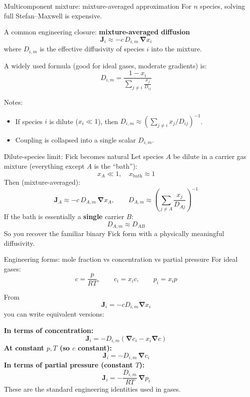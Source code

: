 \documentclass[aspectratio=169]{beamer}
\newcommand{\grad}{\bm{\nabla}}
\newcommand{\J}{\bm{J}}
\begin{document}
\begin{frame}{Multicomponent mixture: mixture-averaged approximation}
For $n$ species, solving full Stefan--Maxwell is expensive.

A common engineering closure: \textbf{mixture-averaged diffusion}
\[
\boxed{\J_i \approx -c\,D_{i,m}\,\grad x_i}
\]
where $D_{i,m}$ is the effective diffusivity of species $i$ into the mixture.

A widely used formula (good for ideal gases, moderate gradients) is:
\[
\boxed{
D_{i,m} = \frac{1-x_i}{\sum\limits_{j\neq i}\frac{x_j}{D_{ij}}}
}
\]

Notes:
\begin{itemize}
  \item If species $i$ is dilute ($x_i\ll 1$), then $D_{i,m}\approx \left(\sum_{j\neq i}x_j/D_{ij}\right)^{-1}$.
  \item Coupling is collapsed into a single scalar $D_{i,m}$.
\end{itemize}
\end{frame}

\begin{frame}{Dilute-species limit: Fick becomes natural}
Let species $A$ be dilute in a carrier gas mixture (everything except $A$ is the ``bath''):
\[
x_A \ll 1,\quad x_{\text{bath}}\approx 1
\]
Then (mixture-averaged):
\[
\J_A \approx -c\,D_{A,m}\,\grad x_A,
\qquad
D_{A,m}\approx \left(\sum_{j\neq A}\frac{x_j}{D_{Aj}}\right)^{-1}
\]
If the bath is essentially a \textbf{single} carrier $B$:
\[
D_{A,m}\approx D_{AB}
\]
So you recover the familiar binary Fick form with a physically meaningful diffusivity.
\end{frame}

\begin{frame}{Engineering forms: mole fraction vs concentration vs partial pressure}
For ideal gases:
\[
c=\frac{p}{RT},\qquad c_i = x_i c,\qquad p_i = x_i p
\]

From
\[
\J_i = -c D_{i,m}\grad x_i
\]
you can write equivalent versions:

\textbf{In terms of concentration:}
\[
\J_i = -D_{i,m}\left(\grad c_i - x_i \grad c\right)
\]
\textbf{At constant $p,T$ (so $c$ constant):}
\[
\boxed{\J_i = -D_{i,m}\,\grad c_i}
\]
\textbf{In terms of partial pressure (constant $T$):}
\[
\boxed{\J_i = -\frac{D_{i,m}}{RT}\,\grad p_i}
\]
These are the standard engineering identities used in gases.
\end{frame}
\end{document}
